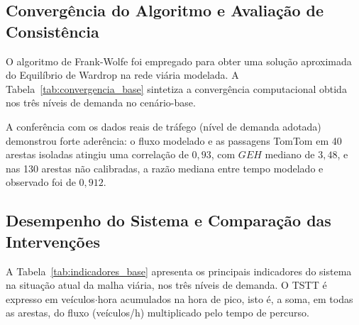 \documentclass[portuguese]{sbc2025}%
\begin{document}
\subsection{Convergência do Algoritmo e Avaliação de Consistência}
O algoritmo de Frank-Wolfe foi empregado para obter uma solução aproximada do Equilíbrio de Wardrop na rede viária modelada. A Tabela~\ref{tab:convergencia_base} sintetiza a convergência computacional obtida nos três níveis de demanda no cenário-base.

\begin{table}[htbp]
\caption{Desempenho de Convergência do Algoritmo de Frank-Wolfe}
\label{tab:convergencia_base}
\centering
{}
\end{table}

A conferência com os dados reais de tráfego (nível de demanda adotada) demonstrou forte aderência: o fluxo modelado e as passagens TomTom em 40 arestas isoladas atingiu uma correlação de $0,93$, com $GEH$ mediano de $3,48$, e nas 130 arestas não calibradas, a razão mediana entre tempo modelado e observado foi de $0,912$.

\subsection{Desempenho do Sistema e Comparação das Intervenções}
A Tabela~\ref{tab:indicadores_base} apresenta os principais indicadores do sistema na situação atual da malha viária, nos três níveis de demanda. O TSTT é expresso em veículos$\cdot$hora acumulados na hora de pico, isto é, a soma, em todas as arestas, do fluxo (veículos/h) multiplicado pelo tempo de percurso.
\end{document}

